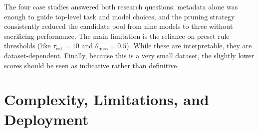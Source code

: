 \documentclass[runningheads]{llncs}
\begin{document}
The four case studies answered both research questions: metadata alone was enough to guide top-level task and model choices, and the pruning strategy consistently reduced the candidate pool from nine models to three without sacrificing performance. The main limitation is the reliance on preset rule thresholds (like $\tau_\text{cat}=10$ and $\theta_\text{miss}=0.5$). While these are interpretable, they are dataset-dependent. Finally, because this is a very small dataset, the slightly lower scores should be seen as indicative rather than definitive.

\section{Complexity, Limitations, and Deployment}
\label{sec:limitations}
\end{document}
